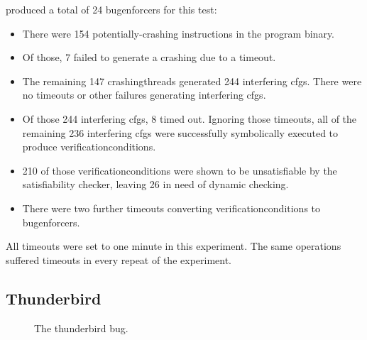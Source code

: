 {\Implementation} produced a total of 24 \glspl{bugenforcer} for this
test:

\begin{itemize}
\item There were 154 potentially-crashing instructions in the
  program binary.
\item Of those, 7 failed to generate a crashing {\StateMachine} due to
  a timeout.
\item The remaining 147 \glspl{crashingthread} generated 244
  interfering \glspl{cfg}.  There were no timeouts or other failures
  generating interfering \glspl{cfg}.
\item Of those 244 interfering \glspl{cfg}, 8 timed out. Ignoring
  those timeouts, all of the remaining 236 interfering \glspl{cfg}
  were successfully symbolically executed to produce
  \glspl{verificationcondition}.
\item 210 of those \glspl{verificationcondition} were shown to be
  unsatisfiable by the satisfiability checker, leaving 26 in need of
  dynamic checking.
\item There were two further timeouts converting
  \glspl{verificationcondition} to \glspl{bugenforcer}.
\end{itemize}

All timeouts were set to one minute in this experiment.  The same
operations suffered timeouts in every repeat of the experiment.

   

\subsection{Thunderbird}

\begin{figure}
  \caption{The thunderbird bug.}
  \label{fig:eval:thunderbird}
\end{figure}

